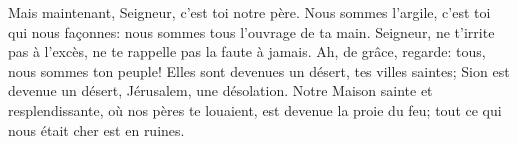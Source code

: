 Mais maintenant, Seigneur, c’est toi notre père.
	Nous sommes l’argile, c’est toi qui nous façonnes:
	nous sommes tous l’ouvrage de ta main.
Seigneur, ne t’irrite pas à l’excès, ne te rappelle pas la faute à jamais.
	Ah, de grâce, regarde: tous, nous sommes ton peuple!
Elles sont devenues un désert, tes villes saintes;
	Sion est devenue un désert, Jérusalem, une désolation.
Notre Maison sainte et resplendissante, où nos pères te louaient,
	est devenue la proie du feu;
	tout ce qui nous était cher est en ruines.
